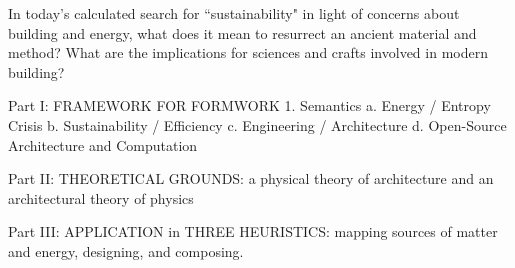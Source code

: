 In today's calculated search for ``sustainability" in light of concerns about building and energy, what does it mean to resurrect an ancient material and method? What are the implications for sciences and crafts involved in modern building?

\clearpage

Part I: FRAMEWORK FOR FORMWORK
  1. Semantics
    a. Energy / Entropy Crisis
    b. Sustainability / Efficiency
    c. Engineering / Architecture
    d. Open-Source Architecture and Computation


Part II: THEORETICAL GROUNDS: a physical theory of architecture and an architectural theory of physics

Part III: APPLICATION in THREE HEURISTICS: mapping sources of matter and energy, designing, and composing.
